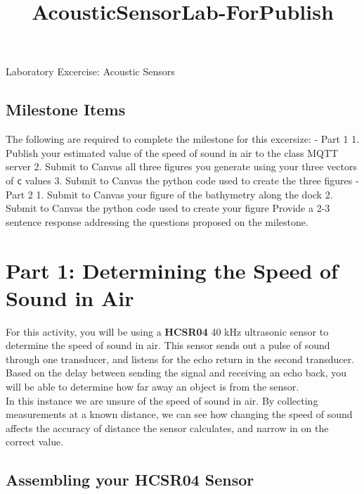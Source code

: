 \documentclass[11pt]{article}
\title{AcousticSensorLab-ForPublish}
\begin{document}
    
    
    \maketitle
    
    

    
    Laboratory Excercise: Acoustic Sensors

\hypertarget{milestone-items}{%
\subsection{Milestone Items}\label{milestone-items}}

The following are required to complete the milestone for this excersize:
- Part 1 1. Publish your estimated value of the speed of sound in air to
the class MQTT server 2. Submit to Canvas all three figures you generate
using your three vectors of \texttt{c} values 3. Submit to Canvas the
python code used to create the three figures - Part 2 1. Submit to
Canvas your figure of the bathymetry along the dock 2. Submit to Canvas
the python code used to create your figure Provide a 2-3 sentence
response addressing the questions proposed on the milestone.

\hypertarget{part-1-determining-the-speed-of-sound-in-air}{%
\section{Part 1: Determining the Speed of Sound in
Air}\label{part-1-determining-the-speed-of-sound-in-air}}

For this activity, you will be using a \textbf{HCSR04} 40 kHz ultrasonic
sensor to determine the speed of sound in air. This sensor sends out a
pulse of sound through one transducer, and listens for the echo return
in the second transducer. Based on the delay between sending the signal
and receiving an echo back, you will be able to determine how far away
an object is from the sensor.\\
In this instance we are unsure of the speed of sound in air. By
collecting measurements at a known distance, we can see how changing the
speed of sound affects the accuracy of distance the sensor calculates,
and narrow in on the correct value.

\hypertarget{assembling-your-hcsr04-sensor}{%
\subsection{Assembling your HCSR04
Sensor}\label{assembling-your-hcsr04-sensor}}
\end{document}
